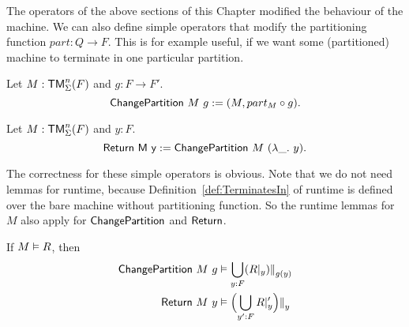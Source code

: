The operators of the above sections of this Chapter modified the behaviour of the machine.  We can also define simple operators that modify the
partitioning function $part : Q \to F$.  This is for example useful, if we want some (partitioned) machine to terminate in one particular partition.

\begin{definition}[$\MS{ChangePartition}$][ChangePartition]
  Let $M:\mathsf{TM}_\Sigma^n(F)$ and $g : F \to F'$.
  \[ \mathsf{ChangePartition}~M~g := (M, part_M \circ g). \]
\end{definition}

\begin{definition}[$\MS{Return}$][Return]
  Let $M:\mathsf{TM}_\Sigma^n(F)$ and $y:F$.
  \[ \mathsf{Return~M~y} := \mathsf{ChangePartition}~M~(\lambda \_.~y). \]
\end{definition}

The correctness for these simple operators is obvious.  Note that we do not need lemmas for runtime, because Definition~\ref{def:TerminatesIn} of
runtime is defined over the bare machine without partitioning function.  So the runtime lemmas for $M$ also apply for $\MS{ChangePartition}$ and
$\MS{Return}$.
\begin{lemma}
  If $M \mathrel{\vDash} R$, then
  \begin{alignat*}{1}
    \mathsf{ChangePartition}~M~g & \mathrel{\vDash} \bigcup_{y:F} (R {|}_{y}) {|\mkern-1.5mu|}_{g(y)} \\
    \mathsf{Return}~M~y          & \mathrel{\vDash} \Bigl( \bigcup_{y':F} R {|}_{y}' \Bigr) {|\mkern-1.5mu|}_{y}
  \end{alignat*}
\end{lemma}


